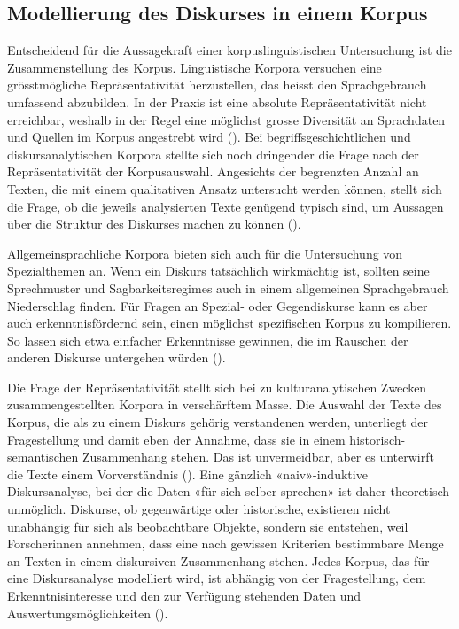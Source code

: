 \subsection{Modellierung des Diskurses in einem Korpus}

Entscheidend für die Aussagekraft einer korpuslinguistischen Untersuchung ist die Zusammenstellung des Korpus. Linguistische Korpora versuchen eine grösstmögliche Repräsentativität herzustellen, das heisst den Sprachgebrauch umfassend abzubilden. In der Praxis ist eine absolute Repräsentativität nicht erreichbar, weshalb in der Regel eine möglichst grosse Diversität an Sprachdaten und Quellen im Korpus angestrebt wird (\cite[34-35]{stefanowitsch_anatol_corpus_2020}). Bei begriffsgeschichtlichen und diskursanalytischen Korpora stellte sich noch dringender die Frage nach der Repräsentativität der Korpusauswahl. Angesichts der begrenzten Anzahl an Texten, die mit einem qualitativen Ansatz untersucht werden können, stellt sich die Frage, ob die jeweils analysierten Texte genügend typisch sind, um Aussagen über die Struktur des Diskurses machen zu können (\cite[101-103]{landwehr_historische_2018}).

Allgemeinsprachliche Korpora bieten sich auch für die Untersuchung von Spezialthemen an. Wenn ein Diskurs tatsächlich wirkmächtig ist, sollten seine Sprechmuster und Sagbarkeitsregimes auch in einem allgemeinen Sprachgebrauch Niederschlag finden. Für Fragen an Spezial- oder Gegendiskurse kann es aber auch erkenntnisfördernd sein, einen möglichst spezifischen Korpus zu kompilieren. So lassen sich etwa einfacher Erkenntnisse gewinnen, die im Rauschen der anderen Diskurse untergehen würden (\cite{hodel_kleine_2013}).

Die Frage der Repräsentativität stellt sich bei zu kulturanalytischen Zwecken zusammengestellten Korpora in verschärftem Masse. Die Auswahl der Texte des Korpus, die als zu einem Diskurs gehörig verstandenen werden, unterliegt der Fragestellung und damit eben der Annahme, dass sie in einem historisch-semantischen Zusammenhang stehen. Das ist unvermeidbar, aber es unterwirft die Texte einem Vorverständnis (\cite[15-16]{busse_ist_1994}). Eine gänzlich «naiv»-induktive Diskursanalyse, bei der die Daten «für sich selber sprechen» ist daher theoretisch unmöglich. Diskurse, ob gegenwärtige oder historische, existieren nicht unabhängig für sich als beobachtbare Objekte, sondern sie entstehen, weil Forscherinnen annehmen, dass eine nach gewissen Kriterien bestimmbare Menge an Texten in einem diskursiven Zusammenhang stehen. Jedes Korpus, das für eine Diskursanalyse modelliert wird, ist abhängig von der Fragestellung, dem Erkenntnisinteresse und den zur Verfügung stehenden Daten und Auswertungsmöglichkeiten (\cite[143-144]{dreesen_diskurslinguistik_2019}).

